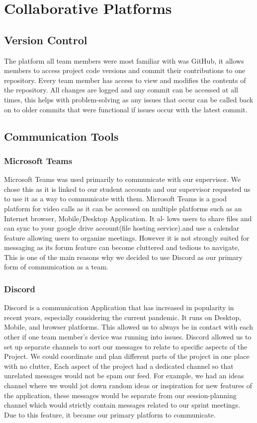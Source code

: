 \section{Collaborative Platforms}
\subsection{Version Control}
The platform all team members were most familiar with was GitHub, it allows members to access project code versions and commit their contributions to one repository. Every team member has access to view and modifies the contents of the repository. All changes are logged and any commit can be accessed at all times, this helps with problem-solving as any issues that occur can be called back on to older commits that were functional if issues occur with the latest commit.

\subsection{Communication Tools}
\subsubsection{Microsoft Teams}
Microsoft Teams was used primarily to communicate with our supervisor. We chose this as it is linked to our student accounts and our supervisor requested us to use it as a way to communicate with them.
\newline 
Microsoft Teams is a good platform for video calls as it can be accessed on multiple platforms such as an Internet browser, Mobile/Desktop Application. It al- lows users to share files and can sync to your google drive account(file hosting service).and use a calendar feature allowing users to organize meetings.
\newline
However it is not strongly suited for messaging as its forum feature can become cluttered and tedious to navigate, This is one of the main reasons why we decided to use Discord as our primary form of communication as a team.

\subsubsection{Discord} 
Discord is a communication Application that has increased in popularity in recent years, especially considering the current pandemic. It runs on Desktop, Mobile, and browser platforms. This allowed us to always be in contact with each other if one team member's device was running into issues.
\newline
Discord allowed us to set up separate channels to sort our messages to relate to specific aspects of the Project. We could coordinate and plan different parts of the project in one place with no clutter, Each aspect of the project had a dedicated channel so that unrelated messages would not be spam our feed. For example, we had an ideas channel where we would jot down random ideas or inspiration for new features of the application, these messages would be separate from our session-planning channel which would strictly contain messages related to our sprint meetings. Due to this feature, it became our primary platform to communicate.
\newline
